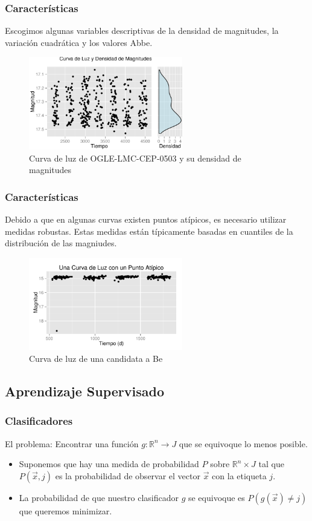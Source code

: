 \documentclass{beamer}
\begin{document}
\begin{frame}
  \frametitle{Características}
  Escogimos algunas variables descriptivas de la densidad de magnitudes, la variación cuadrática y los valores Abbe.
  \begin{figure}
    \centering
    \includegraphics[width=0.6\textwidth]{./img/curvaHist.pdf}
    \caption{ Curva de luz de OGLE-LMC-CEP-0503 y su densidad de magnitudes}
  \end{figure}%
\end{frame}

\begin{frame}
  \frametitle{Características}
  Debido a que en algunas curvas existen puntos atípicos, es necesario utilizar medidas robustas. Estas medidas están típicamente basadas en cuantiles de la distribución de las magniudes. 
  \begin{figure}
    \centering
    \includegraphics[width=0.6\textwidth]{./img/curvaRara.pdf}
    \caption{ Curva de luz de una candidata a Be}
  \end{figure}%
\end{frame}

\subsection{Aprendizaje Supervisado}
\begin{frame}%
\frametitle{Clasificadores}
El problema: Encontrar una función $g:\mathbb{R}^n\to J  $ que se equivoque lo menos posible.
\begin{itemize}
  \item Suponemos que hay una medida de probabilidad $P$ sobre $\mathbb{R}^n\times J$ tal que $P(\vec{x}, j)$ es la probabilidad de observar el vector $\vec{x}$ con la etiqueta $j$.
  \item La probabilidad de que nuestro clasificador $g$ se equivoque es $P(g(\vec{x}) \neq j)$ que queremos minimizar.
  \end{itemize}
\end{frame}
\end{document}
